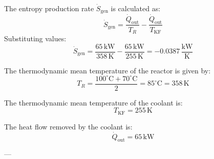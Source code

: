 The entropy production rate \( \dot{S}_{\text{gen}} \) is calculated as:  
\[
\dot{S}_{\text{gen}} = \frac{\dot{Q}_{\text{out}}}{T_R} - \frac{\dot{Q}_{\text{out}}}{T_{\text{KF}}}
\]  
Substituting values:  
\[
\dot{S}_{\text{gen}} = \frac{65 \, \text{kW}}{358 \, \text{K}} - \frac{65 \, \text{kW}}{255 \, \text{K}} = -0.0387 \, \frac{\text{kW}}{\text{K}}
\]  

The thermodynamic mean temperature of the reactor is given by:  
\[
T_R = \frac{100^\circ\text{C} + 70^\circ\text{C}}{2} = 85^\circ\text{C} = 358 \, \text{K}
\]  

The thermodynamic mean temperature of the coolant is:  
\[
T_{\text{KF}} = 255 \, \text{K}
\]  

The heat flow removed by the coolant is:  
\[
\dot{Q}_{\text{out}} = 65 \, \text{kW}
\]  

---